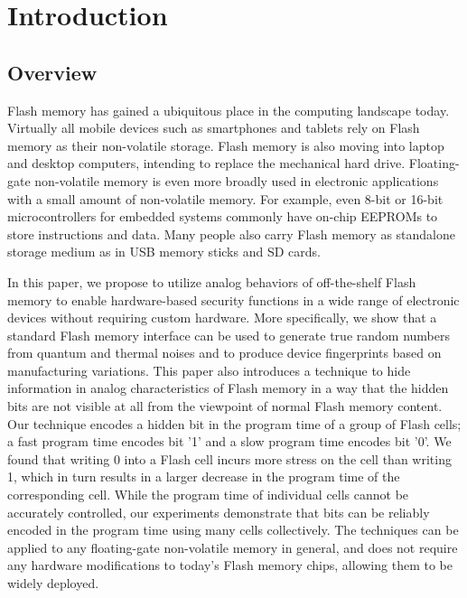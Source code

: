 \chapter{Introduction}

\section{Overview}
Flash memory has gained a ubiquitous place in the computing landscape today. 
Virtually all mobile devices such as smartphones and tablets rely on Flash 
memory as their non-volatile storage. Flash memory is also moving into laptop 
and desktop computers, intending to replace the mechanical hard drive. 
Floating-gate non-volatile memory is even more broadly used in electronic 
applications with a small amount of non-volatile memory. For example, even 
8-bit or 16-bit microcontrollers for embedded systems commonly have on-chip 
EEPROMs to store instructions and data. Many people also carry Flash memory 
as standalone storage medium as in USB memory sticks and SD cards.

In this paper, we propose to utilize analog behaviors of off-the-shelf Flash 
memory to enable hardware-based security functions in a wide range of electronic 
devices without requiring custom hardware. More specifically, we show that a 
standard Flash memory interface can be used to generate true random numbers 
from quantum and thermal noises and to produce device fingerprints based on 
manufacturing variations.
This paper also introduces a technique to hide information in analog characteristics 
of Flash memory in a way that the hidden bits are not visible at all from the viewpoint of normal 
Flash memory content. Our technique encodes a hidden bit in the program
time of a group of Flash cells; a fast program time encodes bit '1' and a slow program time 
encodes bit '0'. We found that writing 0 into a Flash cell incurs more 
stress on the cell than writing 1, which in turn results in a larger decrease in
the program time of the corresponding cell. While the program time of individual cells cannot
be accurately controlled, our experiments demonstrate that bits can be reliably encoded
in the program time using many cells collectively.
The techniques can be applied to any floating-gate 
non-volatile memory in general, and does not require any hardware modifications 
to today’s Flash memory chips, allowing them to be widely deployed.

